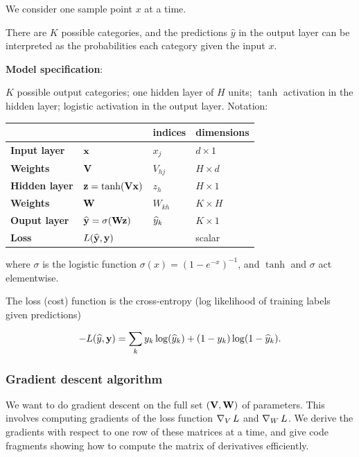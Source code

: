 We consider one sample point $x$ at a time.

There are $K$ possible categories, and the predictions $\hat y$ in the output
layer can be interpreted as the probabilities each category given the input $x$.

\textbf{Model specification}:

$K$ possible output categories; one hidden layer of $H$ units; $\tanh$
activation in the hidden layer; logistic activation in the output
layer. Notation:

\begin{tabular}{l|l|l|l}
                        &                                  & indices   & dimensions \\
  \hline
  \textbf{Input layer}  & $\mathbf x$                             & $x_j$     & $d \times 1$ \\
  \textbf{Weights}      & $\mathbf V$                             & $V_{hj}$  & $H \times d$ \\
  \textbf{Hidden layer} & $\mathbf z = \tanh(\mathbf V \mathbf x)$          & $z_h$     & $H \times 1$ \\
  \textbf{Weights}      & $\mathbf W$                             & $W_{kh}$  & $K \times H$ \\
  \textbf{Ouput layer}  & $\mathbf {\widehat{y}} = \sigma(\mathbf W \mathbf z)$     & $\widehat{y}_k$ & $K \times 1$ \\
  \textbf{Loss}         & $L(\mathbf {\widehat{y}}, \mathbf y)$          &           & scalar \\
\end{tabular}

where $\sigma$ is the logistic function $\sigma(x) = (1-e^{-x})^{-1}$, and
$\tanh$ and $\sigma$ act elementwise.

The loss (cost) function is the cross-entropy (log likelihood of training labels given
predictions)

\begin{align*}
  -L(\widehat{y}, \mathbf y) = \sum_k y_k \log(\widehat{y}_k) + (1 - y_k) \log( 1 - \widehat{y}_k).
\end{align*}

\subsubsection{Gradient descent algorithm}

We want to do gradient descent on the full set $(\mathbf V, \mathbf W)$ of
parameters. This involves computing gradients of the loss function $\operatorname{\nabla}_V L$
and $\operatorname{\nabla}_W L$. We derive the gradients with respect to one row of these
matrices at a time, and give code fragments showing how to compute the matrix
of derivatives efficiently.

